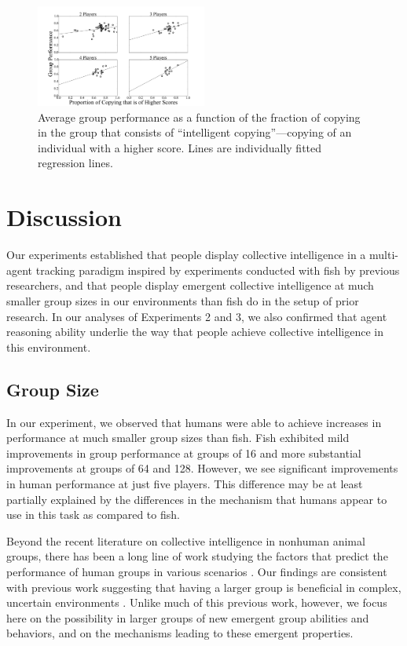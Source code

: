 \documentclass[12pt,letterpaper]{article}
\begin{document}
\begin{figure}
  \centering
  \includegraphics[width=0.5\textwidth]{./figures/copy-true-proportion}
  \caption{Average group performance as a function of the fraction of
    copying in the group that consists of ``intelligent
    copying''---copying of an individual with a higher score.  Lines
    are individually fitted regression lines.}
  \label{fig:proportion}
\end{figure}

\section{Discussion}

Our experiments established that people display collective intelligence in a multi-agent tracking paradigm inspired by experiments conducted with fish by previous researchers, and that people display emergent collective intelligence at much smaller group sizes in our environments than fish do in the setup of prior research.  In our analyses of Experiments 2 and 3, we also confirmed that agent reasoning ability underlie the way that people achieve collective intelligence in this environment.

\subsection{Group Size}

In our experiment, we observed that humans were able to achieve
increases in performance at much smaller group sizes than fish.  Fish
exhibited mild improvements in group performance at groups of 16 and
more substantial improvements at groups of 64 and 128.  However, we
see significant improvements in human performance at just five
players.  This difference may be at least partially explained by the
differences in the mechanism that humans appear to use in this task as
compared to fish.

Beyond the recent literature on collective intelligence in nonhuman
animal groups, there has been a long line of work studying the factors
that predict the performance of human groups in various scenarios
\cite{kerr_group_2004}.  Our findings are consistent with previous
work suggesting that having a larger group is beneficial in complex,
uncertain environments \cite{stewart_meta-analytic_2006}.  Unlike much
of this previous work, however, we focus here on the possibility in
larger groups of new emergent group abilities and behaviors, and on
the mechanisms leading to these emergent properties.
\end{document}
